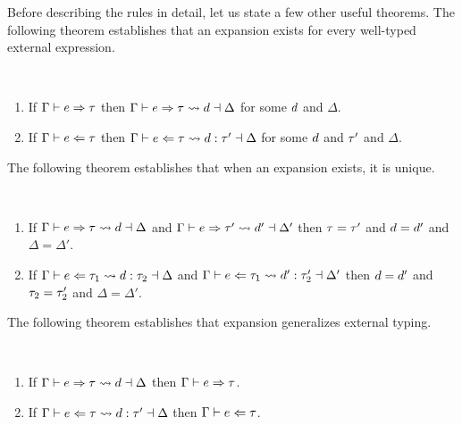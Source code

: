Before describing the rules in detail, let us state a few other useful theorems. The following theorem establishes that an expansion exists for every well-typed external expression.
 \begin{thm}[Expandability] \label{thm:expandability}~
  \begin{enumerate}[nolistsep]
    \item
      If $\Gamma \vdash e \Rightarrow \tau$
      then $\Gamma \vdash e \Rightarrow \tau \leadsto d \dashv \Delta$
      for some $d$ and $\Delta$.
    \item
      If $\Gamma \vdash e \Leftarrow \tau$
      then $\Gamma \vdash e \Leftarrow \tau \leadsto d : \tau' \dashv \Delta$
      for some $d$ and $\tau'$ and $\Delta$.
  \end{enumerate}
\end{thm}
\noindent
The following theorem establishes that when an expansion exists, it is unique.
\begin{thm} \label{thm:expansion-unicity}~
  \begin{enumerate}[nolistsep]
    \item
      If $\Gamma \vdash e \Rightarrow \tau \leadsto d \dashv \Delta$
      and $\Gamma \vdash e \Rightarrow \tau' \leadsto d' \dashv \Delta'$
      then $\tau=\tau'$ and $d=d'$ and $\Delta=\Delta'$.
    \item
      If $\Gamma \vdash e \Leftarrow \tau_1 \leadsto d : \tau_2 \dashv \Delta$
      and $\Gamma \vdash e \Leftarrow \tau_1 \leadsto d' : \tau_2' \dashv \Delta'$
      then $d=d'$ and $\tau_2=\tau_2'$ and $\Delta=\Delta'$.
  \end{enumerate}
\end{thm}
\noindent
The following theorem establishes that expansion generalizes external typing.
\begin{thm} \label{thm:expansion-generality}~
  \begin{enumerate}[nolistsep]
    \item
      If $\Gamma \vdash e \Rightarrow \tau \leadsto d \dashv \Delta$
      then $\Gamma \vdash e \Rightarrow \tau$.
    \item
      If $\Gamma \vdash e \Leftarrow \tau \leadsto d : \tau' \dashv \Delta$
      then $\Gamma \vdash e \Leftarrow \tau$.
  \end{enumerate}
\end{thm}

